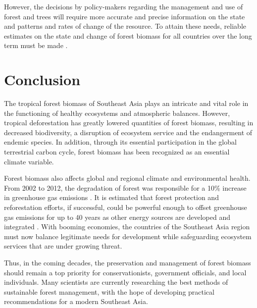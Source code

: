 However, the decisions by policy-makers regarding the management and use of forest and trees will require more accurate and precise information on the state and patterns and rates of change of the resource. To attain these needs, reliable estimates on the state and change of forest biomass for all countries over the long term must be made \citep{brown1991biomass}. 

\section{Conclusion}

The tropical forest biomass of Southeast Asia plays an intricate and vital role in the functioning of healthy ecosystems and atmospheric balances. However, tropical deforestation has greatly lowered quantities of forest biomass, resulting in decreased biodiversity, a disruption of ecosystem service and the endangerment of endemic species. In addition, through its essential participation in the global terrestrial carbon cycle, forest biomass has been recognized as an essential climate variable.

Forest biomass also affects global and regional climate and environmental health.  From 2002 to 2012, the degradation of forest was responsible for a 10\% increase in greenhouse gas emissions \citep{gullison2007tropical}. It is estimated that forest protection and reforestation efforts, if successful, could be powerful enough to offset greenhouse gas emissions for up to 40 years as other energy sources are developed and integrated \citep{lasco2002forest}. With booming economies, the countries of the Southeast Asia region must now balance legitimate needs for development while safeguarding ecosystem services that are under growing threat. 

Thus, in the coming decades, the preservation and management of forest biomass should remain a top priority for conservationists, government officials, and local individuals. Many scientists are currently researching the best methods of sustainable forest management, with the hope of developing practical recommendations for a modern Southeast Asia. 
